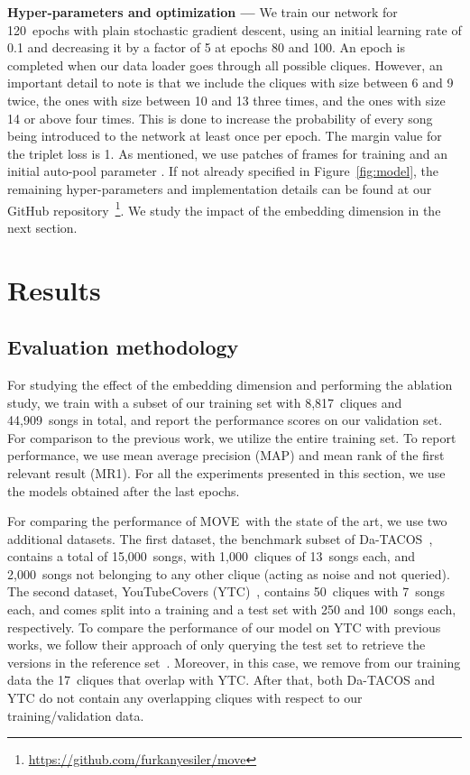 \documentclass[letterpaper]{article}
\newcommand{\modelname}{MOVE}
\begin{document}
\noindent
\textbf{Hyper-parameters and optimization ---} We train our network for 120~epochs with plain stochastic gradient descent, using an initial learning rate of 0.1 and decreasing it by a factor of 5 at epochs 80 and 100. An epoch is completed when our data loader goes through all possible cliques. However, an important detail to note is that we include the cliques with size between 6 and 9 twice, the ones with size between 10 and 13 three times, and the ones with size 14 or above four times. This is done to increase the probability of every song being introduced to the network at least once per epoch. The margin value  for the triplet loss is 1. As mentioned, we use patches of  frames for training and an initial auto-pool parameter . If not already specified in Figure~\ref{fig:model}, the remaining hyper-parameters and implementation details can be found at our GitHub repository~\footnote{\url{https://github.com/furkanyesiler/move}}. We study the impact of the embedding dimension  in the next section.
\vspace{-2mm} \section{Results}
\label{sec:results}

\subsection{Evaluation methodology}

For studying the effect of the embedding dimension and performing the ablation study, we train with a subset of our training set with 8,817~cliques and 44,909~songs in total, and report the performance scores on our validation set. For comparison to the previous work, we utilize the entire training set. To report performance, we use mean average precision (MAP) and mean rank of the first relevant result (MR1). For all the experiments presented in this section, we use the models obtained after the last epochs.

For comparing the performance of \modelname\ with the state of the art, we use two additional datasets. The first dataset, the benchmark subset of Da-TACOS~\cite{yesiler2019}, contains a total of 15,000~songs, with 1,000~cliques of 13~songs each, and 2,000~songs not belonging to any other clique (acting as noise and not queried). The second dataset, YouTubeCovers (YTC)~\cite{silva2015}, contains 50~cliques with 7~songs each, and comes split into a training and a test set with 250 and 100~songs each, respectively. To compare the performance of our model on YTC with previous works, we follow their approach of only querying the test set to retrieve the versions in the reference set~\cite{silva2016, seetharaman2017, xu2018, yu2019}. Moreover, in this case, we remove from our training data the 17~cliques that overlap with YTC. After that, both Da-TACOS and YTC do not contain any overlapping cliques with respect to our training/validation data.
\vspace{-1mm}
\end{document}
